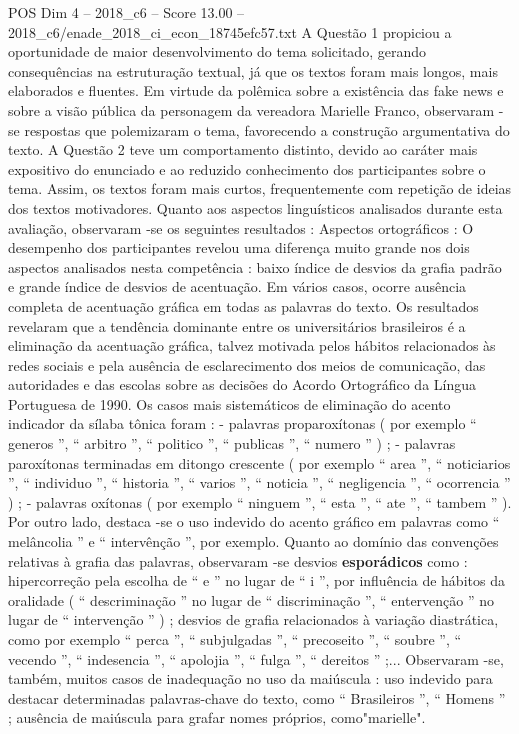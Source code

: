\begin{textsample}{POS Dim 4 – 2018\_c6 – Score 13.00 – 2018\_c6/enade\_2018\_ci\_econ\_18745efc57.txt}
A Questão 1 propiciou a oportunidade de maior desenvolvimento do tema solicitado, gerando consequências na estruturação textual, já que os textos foram mais longos, mais elaborados e fluentes.
Em virtude da polêmica sobre a existência das fake news e sobre a visão pública da personagem da vereadora Marielle Franco, observaram -se respostas que polemizaram o tema, favorecendo a construção argumentativa do texto.
A Questão 2 teve um comportamento distinto, devido ao caráter mais expositivo do enunciado e ao reduzido conhecimento dos participantes sobre o tema.
Assim, os textos foram mais curtos, frequentemente com repetição de ideias dos textos motivadores.
Quanto aos aspectos linguísticos analisados durante esta avaliação, observaram -se os seguintes resultados : Aspectos ortográficos : O desempenho dos participantes revelou uma diferença muito grande nos dois aspectos analisados nesta competência : baixo índice de desvios da grafia padrão e grande índice de desvios de acentuação.
Em vários casos, ocorre ausência completa de acentuação gráfica em todas as palavras do texto.
Os resultados revelaram que a tendência dominante entre os universitários brasileiros é a eliminação da acentuação gráfica, talvez motivada pelos hábitos relacionados às redes sociais e pela ausência de esclarecimento dos meios de comunicação, das autoridades e das escolas sobre as decisões do Acordo Ortográfico da Língua Portuguesa de 1990.
Os casos mais sistemáticos de eliminação do acento indicador da sílaba tônica foram : - palavras proparoxítonas ( por exemplo “ generos ”, “ arbitro ”, “ politico ”, “ publicas ”, “ numero ” ) ; - palavras paroxítonas terminadas em ditongo crescente ( por exemplo “ area ”, “ noticiarios ”, “ individuo ”, “ historia ”, “ varios ”, “ noticia ”, “ negligencia ”, “ ocorrencia ” ) ; - palavras oxítonas ( por exemplo “ ninguem ”, “ esta ”, “ ate ”, “ tambem ” ).
Por outro lado, destaca -se o uso indevido do acento gráfico em palavras como “ melâncolia ” e “ intervênção ”, por exemplo.
Quanto ao domínio das convenções relativas à grafia das palavras, observaram -se desvios \textbf{esporádicos} como : hipercorreção pela escolha de “ e ” no lugar de “ i ”, por influência de hábitos da oralidade ( “ descriminação ” no lugar de “ discriminação ”, “ entervenção ” no lugar de “ intervenção ” ) ; desvios de grafia relacionados à variação diastrática, como por exemplo “ perca ”, “ subjulgadas ”, “ precoseito ”, “ soubre ”, “ vecendo ”, “ indesencia ”, “ apolojia ”, “ fulga ”, “ dereitos ” ;...
Observaram -se, também, muitos casos de inadequação no uso da maiúscula : uso indevido para destacar determinadas palavras-chave do texto, como “ Brasileiros ”, “ Homens ” ; ausência de maiúscula para grafar nomes próprios, como"marielle".

\end{textsample}

